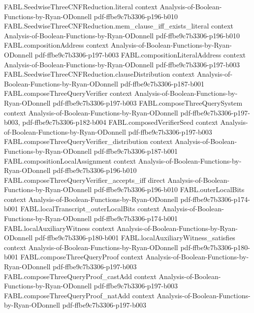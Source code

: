 \begin{theorem}
\proofstep
  {FABL.SeedwiseThreeCNFReduction.literal}
  {context}
  {Analysis-of-Boolean-Functions-by-Ryan-ODonnell}
  {pdf-ffbe9c7b3306-p196-b010}
\proofstep
  {FABL.SeedwiseThreeCNFReduction.mem_clause_iff_exists_literal}
  {context}
  {Analysis-of-Boolean-Functions-by-Ryan-ODonnell}
  {pdf-ffbe9c7b3306-p196-b010}
\proofstep
  {FABL.compositionAddress}
  {context}
  {Analysis-of-Boolean-Functions-by-Ryan-ODonnell}
  {pdf-ffbe9c7b3306-p197-b003}
\proofstep
  {FABL.compositionLiteralAddress}
  {context}
  {Analysis-of-Boolean-Functions-by-Ryan-ODonnell}
  {pdf-ffbe9c7b3306-p197-b003}
\proofstep
  {FABL.SeedwiseThreeCNFReduction.clauseDistribution}
  {context}
  {Analysis-of-Boolean-Functions-by-Ryan-ODonnell}
  {pdf-ffbe9c7b3306-p187-b001}
\proofstep
  {FABL.composeThreeQueryVerifier}
  {context}
  {Analysis-of-Boolean-Functions-by-Ryan-ODonnell}
  {pdf-ffbe9c7b3306-p197-b003}
\proofstep
  {FABL.composeThreeQuerySystem}
  {context}
  {Analysis-of-Boolean-Functions-by-Ryan-ODonnell}
  {pdf-ffbe9c7b3306-p197-b003,
    pdf-ffbe9c7b3306-p182-b004}
\proofstep
  {FABL.composedVerifierSeed}
  {context}
  {Analysis-of-Boolean-Functions-by-Ryan-ODonnell}
  {pdf-ffbe9c7b3306-p197-b003}
\proofstep
  {FABL.composeThreeQueryVerifier_distribution}
  {context}
  {Analysis-of-Boolean-Functions-by-Ryan-ODonnell}
  {pdf-ffbe9c7b3306-p187-b001}
\proofstep
  {FABL.compositionLocalAssignment}
  {context}
  {Analysis-of-Boolean-Functions-by-Ryan-ODonnell}
  {pdf-ffbe9c7b3306-p196-b010}
\proofstep
  {FABL.composeThreeQueryVerifier_accepts_iff}
  {direct}
  {Analysis-of-Boolean-Functions-by-Ryan-ODonnell}
  {pdf-ffbe9c7b3306-p196-b010}
\proofstep
  {FABL.outerLocalBits}
  {context}
  {Analysis-of-Boolean-Functions-by-Ryan-ODonnell}
  {pdf-ffbe9c7b3306-p174-b001}
\proofstep
  {FABL.localTranscript_outerLocalBits}
  {context}
  {Analysis-of-Boolean-Functions-by-Ryan-ODonnell}
  {pdf-ffbe9c7b3306-p174-b001}
\proofstep
  {FABL.localAuxiliaryWitness}
  {context}
  {Analysis-of-Boolean-Functions-by-Ryan-ODonnell}
  {pdf-ffbe9c7b3306-p180-b001}
\proofstep
  {FABL.localAuxiliaryWitness_satisfies}
  {context}
  {Analysis-of-Boolean-Functions-by-Ryan-ODonnell}
  {pdf-ffbe9c7b3306-p180-b001}
\proofstep
  {FABL.composeThreeQueryProof}
  {context}
  {Analysis-of-Boolean-Functions-by-Ryan-ODonnell}
  {pdf-ffbe9c7b3306-p197-b003}
\proofstep
  {FABL.composeThreeQueryProof_castAdd}
  {context}
  {Analysis-of-Boolean-Functions-by-Ryan-ODonnell}
  {pdf-ffbe9c7b3306-p197-b003}
\proofstep
  {FABL.composeThreeQueryProof_natAdd}
  {context}
  {Analysis-of-Boolean-Functions-by-Ryan-ODonnell}
  {pdf-ffbe9c7b3306-p197-b003}

\end{theorem}
